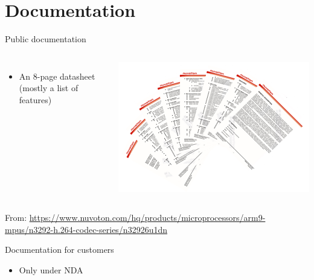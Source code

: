 \documentclass[xetex,table,aspectratio=169]{beamer}
\begin{document}
\section{Documentation}

\begin{frame}{Public documentation}
  \begin{columns}
    \begin{itemize}
    \item An 8-page datasheet (mostly a list of features)
    \end{itemize}
    \includegraphics[height=0.4\textheight]{images/datasheet.png}
  \end{columns}

  \vspace{0.2\textheight}

  From: {\tiny\url{https://www.nuvoton.com/hq/products/microprocessors/arm9-mpus/n3292-h.264-codec-series/n32926u1dn}}
\end{frame}

\begin{frame}{Documentation for customers}
  \begin{itemize}
  \item Only under NDA
  \end{itemize}
\end{frame}
\end{document}
